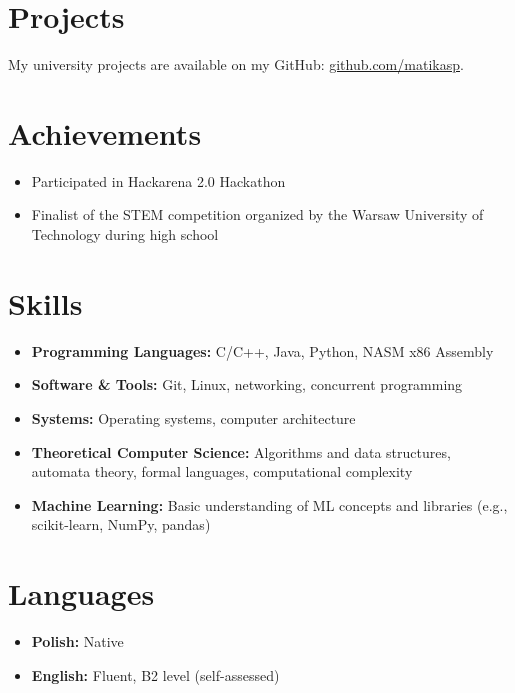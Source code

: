 \documentclass[a4paper,10pt]{article}
\begin{document}
\section*{Projects}
My university projects are available on my GitHub: \href{https://github.com/matikasp}{github.com/matikasp}.

\section*{Achievements}
\begin{itemize}[left=0pt]
    \item Participated in Hackarena 2.0 Hackathon
    \item Finalist of the STEM competition organized by the Warsaw University of Technology during high school
\end{itemize}

\section*{Skills}
\begin{itemize}[left=0pt]
    \item \textbf{Programming Languages:} C/C++, Java, Python, NASM x86 Assembly
    \item \textbf{Software \& Tools:} Git, Linux, networking, concurrent programming
    \item \textbf{Systems:} Operating systems, computer architecture
    \item \textbf{Theoretical Computer Science:} Algorithms and data structures, automata theory, formal languages, computational complexity
    \item \textbf{Machine Learning:} Basic understanding of ML concepts and libraries (e.g., scikit-learn, NumPy, pandas)
\end{itemize}

\section*{Languages}
\begin{itemize}[left=0pt]
    \item \textbf{Polish:} Native
    \item \textbf{English:} Fluent, B2 level (self-assessed)
\end{itemize}
\end{document}
